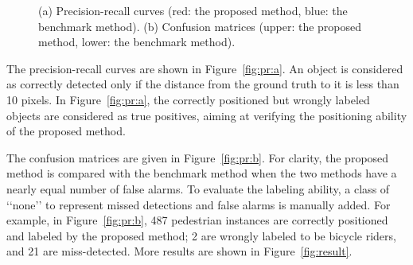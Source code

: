 \documentclass{mva2011}
\begin{document}
\begin{figure}
{\begin{minipage}[b]{0.22\textwidth}
\end{minipage}
\label{fig:pr:b}}
\caption{(a) Precision-recall curves (red: the proposed method, blue: the benchmark method). (b) Confusion matrices (upper: the proposed method, lower: the benchmark method).}
\label{fig:pr}
\end{figure}

The precision-recall curves are shown in Figure~\ref{fig:pr:a}. An object is considered as correctly detected only if the distance from the ground truth to it is less than 10 pixels. In Figure~\ref{fig:pr:a}, the correctly positioned but wrongly labeled objects are considered as true positives, aiming at verifying the positioning ability of the proposed method.

The confusion matrices are given in Figure~\ref{fig:pr:b}. For clarity, the proposed method is compared with the benchmark method when the two methods have a nearly equal number of false alarms. To evaluate the labeling ability, a class of {\lq\lq}none{\rq\rq} to represent missed detections and false alarms is manually added. For example, in Figure~\ref{fig:pr:b}, 487 pedestrian instances are correctly positioned and labeled by the proposed method; 2 are wrongly labeled to be bicycle riders, and 21 are miss-detected. More results are shown in Figure~\ref{fig:result}.
\end{document}
